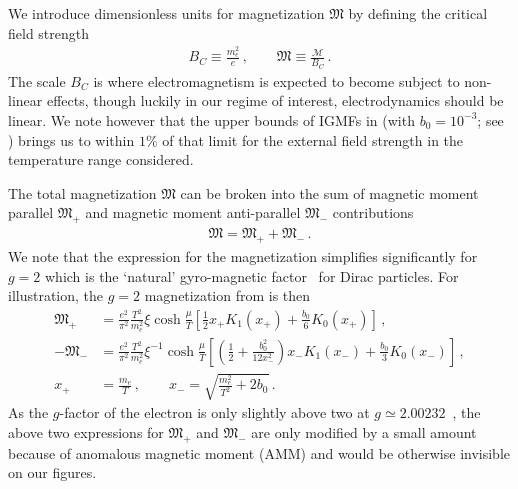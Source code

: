 We introduce dimensionless units for magnetization ${\mathfrak M}$ by defining the critical field strength
\begin{align}
 {B}_{C}\equiv\frac{m_{e}^{2}}{e}\,,\qquad{\mathfrak M}\equiv\frac{\mathcal{M}}{{B}_{C}}\,.
\end{align}
The scale ${B}_{C}$ is where electromagnetism is expected to become subject to non-linear effects, though luckily in our regime of interest, electrodynamics should be linear. We note however that the upper bounds of IGMFs in  (with $b_{0}=10^{-3}$; see ) brings us to within $1\%$ of that limit for the external field strength in the temperature range considered.

The total magnetization ${\mathfrak M}$ can be broken into the sum of magnetic moment parallel ${\mathfrak M}_{+}$ and magnetic moment anti-parallel ${\mathfrak M}_{-}$ contributions
\begin{align}
\label{g2mag}
{\mathfrak M}={\mathfrak M}_{+}+{\mathfrak M}_{-}\,.
\end{align}
We note that the expression for the magnetization simplifies significantly for $g\!=\!2$ which is the `natural' gyro-magnetic factor~\citep{Evans:2022fsu,Rafelski:2022bsv} for Dirac particles. For illustration, the $g\!=\!2$ magnetization from  is then
\begin{align}
 \label{g2magplus}
 {\mathfrak M}_{+}&=\frac{e^{2}}{\pi^{2}}\frac{T^{2}}{m_{e}^{2}}\xi\cosh{\frac{\mu}{T}}\left[\frac{1}{2}x_{+}K_{1}(x_{+})+\frac{b_{0}}{6}K_{0}(x_{+})\right]\,,\\
 \label{g2magminus}
 -{\mathfrak M}_{-}&=\frac{e^{2}}{\pi^{2}}\frac{T^{2}}{m_{e}^{2}}\xi^{-1}\cosh{\frac{\mu}{T}}
 \left[\left(\frac{1}{2}+\frac{b_{0}^{2}}{12x_{-}^{2}}\right)x_{-}K_{1}(x_{-})+\frac{b_{0}}{3}K_{0}(x_{-})\right]\,,\\
 x_{+}&=\frac{m_{e}}{T}\,,\qquad
 x_{-}=\sqrt{\frac{m_{e}^{2}}{T^{2}}+2b_{0}}\,.
\end{align}
As the $g$-factor of the electron is only slightly above two at $g\simeq2.00232$~\citep{Tiesinga:2021myr}, the above two expressions for ${\mathfrak M}_{+}$ and ${\mathfrak M}_{-}$ are only modified by a small amount because of anomalous magnetic moment (AMM) and would be otherwise invisible on our figures.

